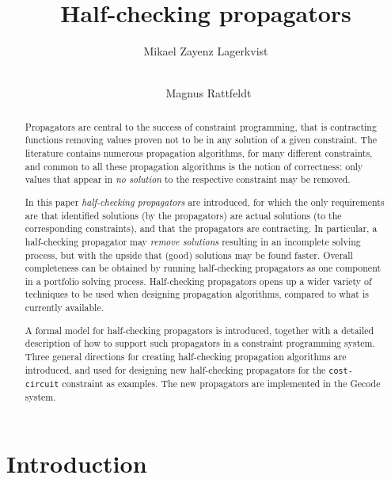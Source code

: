 \documentclass[runningheads]{llncs}
\newcommand{\cons}[1]{\texttt{#1}}
\begin{document}
\title{Half-checking propagators}
\author{Mikael Zayenz Lagerkvist
  \and \\ Magnus Rattfeldt}

\maketitle


\begin{abstract}
  Propagators are central to the success of constraint programming,
  that is contracting functions removing values proven not to be in
  any solution of a given constraint.
  The literature contains numerous propagation algorithms, for many
  different constraints, and common to all these propagation
  algorithms is the notion of correctness: only values that appear in
  \emph{no solution} to the respective constraint may be removed.

  In this paper \emph{half-checking propagators} are introduced, for
  which the only requirements are that identified solutions (by the
  propagators) are actual solutions (to the corresponding
  constraints), and that the propagators are contracting.
  In particular, a half-checking propagator may \emph{remove
    solutions} resulting in an incomplete solving process, but with
  the upside that (good) solutions may be found faster.
  Overall completeness can be obtained by running half-checking
  propagators as one component in a portfolio solving process.
  Half-checking propagators opens up a wider variety of techniques to
  be used when designing propagation algorithms, compared to what is
  currently available.

  A formal model for half-checking propagators is
  introduced, together with a detailed description of how to support
  such propagators in a constraint programming system.
  Three general directions for creating half-checking propagation
  algorithms are introduced, and used for designing new half-checking
  propagators for the \cons{cost-circuit} constraint as examples.
  The new propagators are implemented in the Gecode system.
\end{abstract}


\section{Introduction}
\label{sec:introduction}
\end{document}

